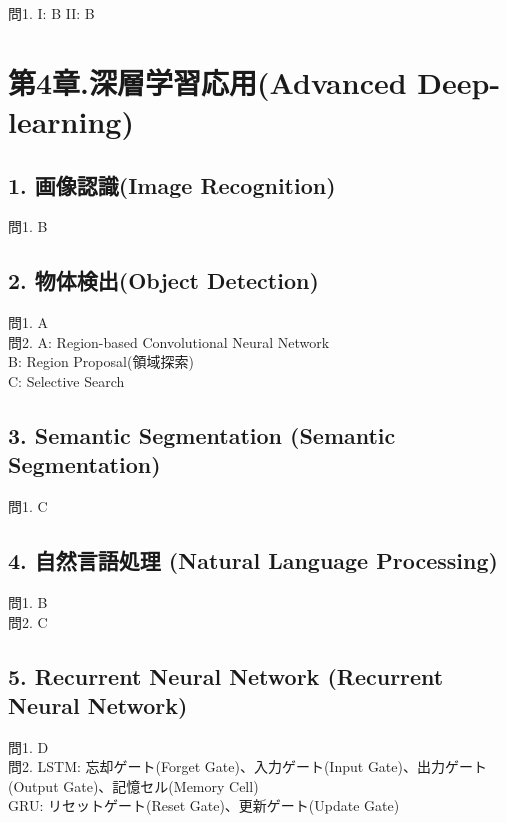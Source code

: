 \documentclass[
  letterpaper,
  DIV=11,
  numbers=noendperiod]{scrreprt}
\begin{document}
問1. I: B II: B


\chapter{第4章.深層学習応用(Advanced
Deep-learning)}\label{ux7b2c4ux7ae0.ux6df1ux5c64ux5b66ux7fd2ux5fdcux7528advanced-deep-learning-1}

\section{1. 画像認識(Image
Recognition)}\label{ux753bux50cfux8a8dux8b58image-recognition-1}

問1. B

\section{2. 物体検出(Object
Detection)}\label{ux7269ux4f53ux691cux51faobject-detection-1}

問1. A\\
問2. A: Region-based Convolutional Neural Network\\
B: Region Proposal(領域探索)\\
C: Selective Search

\section{3. Semantic Segmentation (Semantic
Segmentation)}\label{semantic-segmentation-semantic-segmentation-1}

問1. C

\section{4. 自然言語処理 (Natural Language
Processing)}\label{ux81eaux7136ux8a00ux8a9eux51e6ux7406-natural-language-processing-1}

問1. B\\
問2. C

\section{5. Recurrent Neural Network (Recurrent Neural
Network)}\label{recurrent-neural-network-recurrent-neural-network-1}

問1. D\\
問2. LSTM: 忘却ゲート(Forget Gate)、入力ゲート(Input
Gate)、出力ゲート(Output Gate)、記憶セル(Memory Cell)\\
GRU: リセットゲート(Reset Gate)、更新ゲート(Update Gate)
\end{document}
